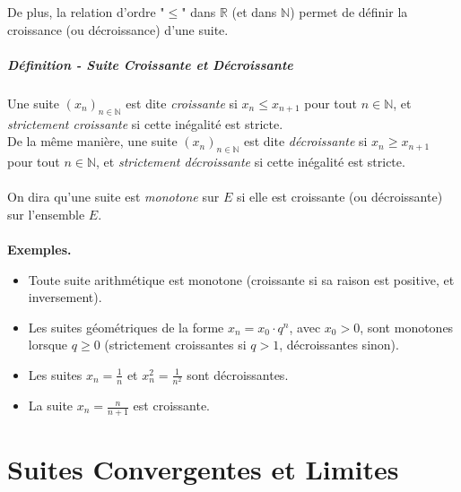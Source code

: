 \documentclass[oneside,11pt,french,table]{book}
\theoremstyle{definition}
\theoremstyle{plain}
\theoremstyle{remark}
\begin{document}
\indent De plus, la relation d'ordre "$\leq$" dans $\mathbb{R}$ (et dans $\mathbb{N}$) permet de définir la croissance (ou décroissance) d'une suite. \paragraph{Définition - Suite Croissante et Décroissante}\newline

\indent Une suite $(x_n)_{n\in \mathbb{N}}$ est dite \textit{croissante} si $x_n\leq x_{n+1}$ pour tout $n\in \mathbb{N}$, et \textit{strictement croissante} si cette inégalité est stricte. \\
De la même manière, une suite $(x_n)_{n\in \mathbb{N}}$ est dite \textit{décroissante} si $x_n\geq x_{n+1}$ pour tout $n\in \mathbb{N}$, et \textit{strictement décroissante} si cette inégalité est stricte.
\\ \\
On dira qu'une suite est \textit{monotone} sur $E$ si elle est croissante (ou décroissante) sur l'ensemble $E$. \\ \\
\textbf{Exemples.} \\
\begin{itemize}
\item Toute suite arithmétique est monotone (croissante si sa raison est positive, et inversement). \\
\item Les suites géométriques de la forme $x_n = x_0 \cdot q^n$, avec $x_0 > 0$, sont monotones lorsque $q \geq 0$ (strictement croissantes si $q > 1$, décroissantes sinon). \\
\item Les suites $x_n = \frac{1}{n}$ et $x_n^2 = \frac{1}{n^2}$ sont décroissantes. \\
\item La suite $x_n = \frac{n}{n+1}$ est croissante.
\end{itemize}

\chapter{Suites Convergentes et Limites}
\end{document}
